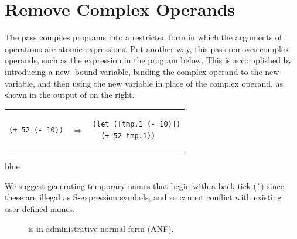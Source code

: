 \documentclass[11pt]{book}
\newenvironment{ocamlx}{
  \begin{color}{blue}
}
{
  \end{color}
}
\begin{document}
\section{Remove Complex Operands}
\label{sec:remove-complex-opera-Rvar}

The  pass compiles \LangVar{} programs
into a restricted form in which the arguments of operations are atomic
expressions.  Put another way, this pass removes complex
operands, such as the expression 
in the program below. This is accomplished by introducing a new
-bound variable, binding the complex operand to the new
variable, and then using the new variable in place of the complex
operand, as shown in the output of  on the
right.\\
\begin{tabular}{lll}
\begin{minipage}{0.4\textwidth}
\begin{lstlisting}
(+ 52 (- 10))
\end{lstlisting}
\end{minipage}
&
$\Rightarrow$
&
\begin{minipage}{0.4\textwidth}
\begin{lstlisting}
(let ([tmp.1 (- 10)])
  (+ 52 tmp.1))
\end{lstlisting}
\end{minipage}
\end{tabular}

\begin{ocamlx}
We suggest generating temporary names that begin with a back-tick (\verb'`')
since these are illegal as S-expression symbols, and so cannot conflict with existing
user-defined names.
\end{ocamlx}
\begin{figure}[tp]
\centering
{}
\caption{\LangVarANF{} is \LangVar{} in administrative normal form (ANF).}
\label{fig:r1-anf-syntax}
\end{figure}
\end{document}
